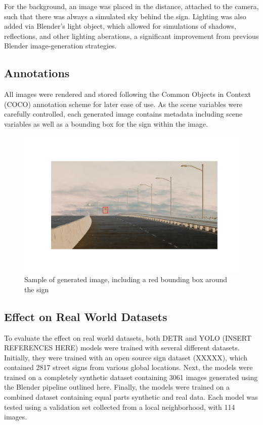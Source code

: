 \documentclass[journal]{IEEEtran}
\begin{document}
For the background, an image was placed in the distance, attached to the camera, such that there was always a simulated sky behind the sign. Lighting was also added via Blender's light object, which allowed for simulations of shadows, reflections, and other lighting aberations, a significant improvement from previous Blender image-generation strategies\cite{blender_paper}. 

\subsection{Annotations}
All images were rendered and stored following the Common Objects in Context (COCO) annotation scheme for later ease of use. As the scene variables were carefully controlled, each generated image contains metadata including scene variables as well as a bounding box for the sign within the image. 

\begin{figure}[ht]
    \centering
    \includegraphics[width=\linewidth]{images/sign w box.png}
    \caption{Sample of generated image, including a red bounding box around the sign}
    \label{fig:row_of_images}
\end{figure}



\subsection{Effect on Real World Datasets}
To evaluate the effect on real world datasets, both DETR and YOLO (INSERT REFERENCES HERE) models were trained with several different datasets. Initially, they were trained with an open source sign dataset (XXXXX), which contained 2817 street signs from various global locations. Next, the models were trained on a completely synthetic dataset containing 3061 images generated using the Blender pipeline outlined here. Finally, the models were trained on a combined dataset containing equal parts synthetic and real data. Each model was tested using a validation set collected from a local neighborhood, with 114 images. 
\end{document}
